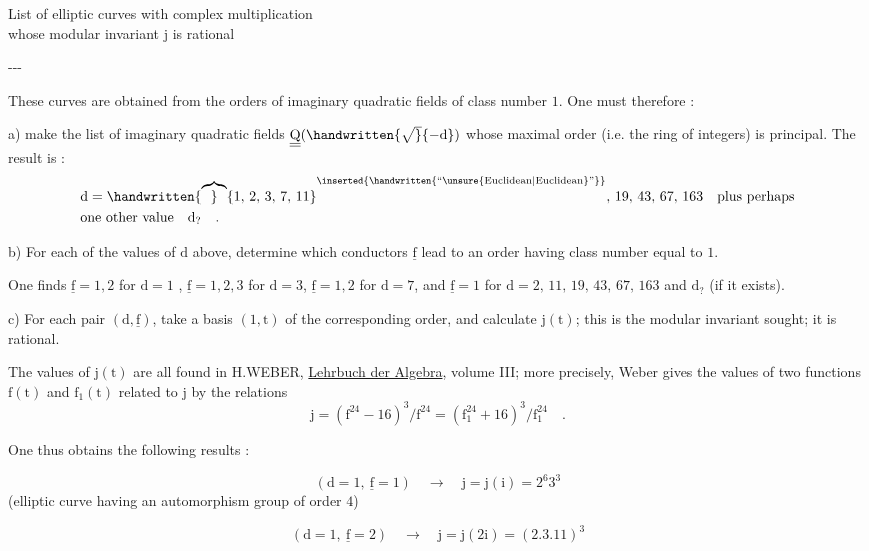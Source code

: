 \clearpage
{}
\reversemarginpar
{}
\normalmarginpar
{}

\begin{center}
List of elliptic curves with complex multiplication\\
whose modular invariant $\mathrm{j}$ is rational

\medskip
-{}-{}-
\end{center}

These curves are obtained from the orders of imaginary quadratic fields of class number $1$. One must therefore :

a) make the list of imaginary quadratic fields $\underline{\underline{\mathrm{Q}}}(\handwritten{\sqrt}{-\mathrm{d}})$ whose maximal order (i.e. the ring of integers) is principal. The result is :
\reversemarginpar
{}
\normalmarginpar
\[
\begin{aligned}
&\mathrm{d} = \handwritten{\overbrace}{1,\,2,\,3,\,7,\,11}^{\inserted{\handwritten{\text{``\unsure{Euclidean|Euclidean}''}}}},\,19,\,43,\,67,\,163 \quad \text{plus perhaps}\\
&\text{one other value}\quad \mathrm{d}_{?}\quad .
\end{aligned}
\]

b) For each of the values of $\mathrm{d}$ above, determine which conductors $\underline{\mathrm{f}}$ lead to an order having class number equal to $1$.

One finds $\underline{\mathrm{f}}=1,2$ for $\mathrm{d}=1$ , $\underline{\mathrm{f}}=1,2,3$ for $\mathrm{d}=3$, $\underline{\mathrm{f}}=1,2$ for $\mathrm{d}=7$, and $\underline{\mathrm{f}}=1$ for $\mathrm{d}=2,\,11,\,19,\,43,\,67,\,163$ and $\mathrm{d}_{?}$ (if it exists).

c) For each pair $(\mathrm{d},\underline{\mathrm{f}})$, take a basis $(1,\mathrm{t})$ of the corresponding order, and calculate $\mathrm{j}(\mathrm{t})$; this is the modular invariant sought; it is rational.

The values of $\mathrm{j}(\mathrm{t})$ are all found in H.WEBER, \uline{Lehrbuch der Algebra}, volume III; more precisely, Weber gives the values of two functions $\mathrm{f}(\mathrm{t})$ and $\mathrm{f}_{1}(\mathrm{t})$ related to $\mathrm{j}$ by the relations
\[
\mathrm{j}=(\mathrm{f}^{24}-16)^{3}/\mathrm{f}^{24}
       =(\mathrm{f}_{1}^{24}+16)^{3}/\mathrm{f}_{1}^{24}\quad .
\]

One thus obtains the following results :

\begingroup
\makeatletter\tagsleft@true\makeatother
\[
(\mathrm{d}=1,\ \underline{\mathrm{f}}=1)\quad \rightarrow\quad
\mathrm{j}=\mathrm{j}(\mathrm{i})=2^{6}3^{3}
\tag*{1.1.}
\]
(elliptic curve having an automorphism group of order $4$)

\[
(\mathrm{d}=1,\ \underline{\mathrm{f}}=2)\quad \rightarrow\quad
\mathrm{j}=\mathrm{j}(2\mathrm{i})=(2.3.11)^{3}
\tag*{1.2}
\]
\endgroup
